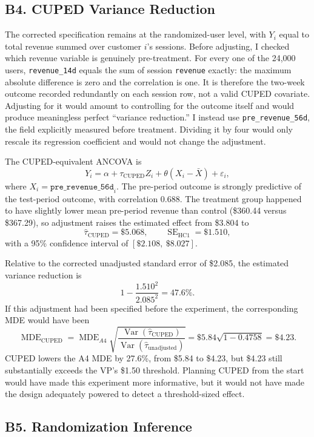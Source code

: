 \documentclass[11pt]{article}
\begin{document}
\subsection*{B4. CUPED Variance Reduction}

The corrected specification remains at the randomized-user level, with
$Y_i$ equal to total revenue summed over customer $i$'s sessions. Before
adjusting, I checked which revenue variable is genuinely pre-treatment. For
every one of the 24,000 users, \texttt{revenue\_14d} equals the sum of session
\texttt{revenue} exactly: the maximum absolute difference is zero and the
correlation is one. It is therefore the two-week outcome recorded redundantly
on each session row, not a valid CUPED covariate. Adjusting for it would amount
to controlling for the outcome itself and would produce meaningless perfect
``variance reduction.'' I instead use \texttt{pre\_revenue\_56d}, the field
explicitly measured before treatment. Dividing it by four would only rescale
its regression coefficient and would not change the adjustment.

The CUPED-equivalent ANCOVA is
\[
Y_i=\alpha+\tau_{\mathrm{CUPED}}Z_i
    +\theta\left(X_i-\bar X\right)+\varepsilon_i,
\]
where $X_i=\texttt{pre\_revenue\_56d}_i$. The pre-period outcome is strongly
predictive of the test-period outcome, with correlation 0.688. The treatment
group happened to have slightly lower mean pre-period revenue than control
(\$360.44 versus \$367.29), so adjustment raises the estimated effect from
\$3.804 to
\[
\widehat{\tau}_{\mathrm{CUPED}}=\$5.068,
\qquad
\operatorname{SE}_{\mathrm{HC1}}=\$1.510,
\]
with a 95\% confidence interval of $[\$2.108,\ \$8.027]$.

Relative to the corrected unadjusted standard error of \$2.085, the estimated
variance reduction is
\[
1-\frac{1.510^2}{2.085^2}=47.6\%.
\]
If this adjustment had been specified before the experiment, the corresponding
MDE would have been
\[
\operatorname{MDE}_{\mathrm{CUPED}}
=\operatorname{MDE}_{A4}
 \sqrt{\frac{\operatorname{Var}(\widehat\tau_{\mathrm{CUPED}})}
              {\operatorname{Var}(\widehat\tau_{\mathrm{unadjusted}})}}
=\$5.84\sqrt{1-0.4758}=\$4.23.
\]
CUPED lowers the A4 MDE by 27.6\%, from \$5.84 to \$4.23, but \$4.23 still
substantially exceeds the VP's \$1.50 threshold. Planning CUPED from the start
would have made this experiment more informative, but it would not have made
the design adequately powered to detect a threshold-sized effect.

\subsection*{B5. Randomization Inference}
\end{document}
